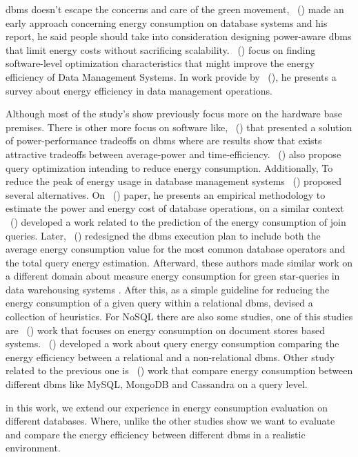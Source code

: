 \gls{dbms} doesn't escape the concerns and care of the green movement, \citeauthor{agrawal2008claremont}~(\citeyear{agrawal2008claremont}) made an early approach concerning energy consumption on database systems and his report, he said people should take into consideration designing power-aware \gls{dbms} that limit energy costs without sacrificing scalability.
\citeauthor{HarizopoulosEnergy}~(\citeyear{HarizopoulosEnergy}) focus on finding software-level optimization characteristics that might improve the energy efficiency of Data Management Systems. 
In work provide by \citeauthor{wang2011survey}~(\citeyear{wang2011survey}), he presents a survey about energy efficiency in data management operations.

Although most of the study's show previously focus more on the hardware base premises. There is other more focus on software like,
\citeauthor{5447840}~(\citeyear{5447840}) that presented a solution of power-performance tradeoffs on \gls{dbms} where are results show that exists attractive tradeoffs between average-power and time-efficiency. \citeauthor{xupet}~(\citeyear{xupet}) also propose query optimization intending to reduce energy consumption. Additionally, To reduce the peak of energy usage in database management systems \citeauthor{KunjirPeakPower}~(\citeyear{KunjirPeakPower}) proposed several alternatives. On \citeauthor{RODRIGUEZMARTINEZ2011112}~(\citeyear{RODRIGUEZMARTINEZ2011112}) paper, he presents an empirical methodology to estimate the power and energy cost of database operations, on a similar context \citeauthor{6738985}~(\citeyear{6738985}) developed a work related to the prediction of the energy consumption of join queries. Later, \citeauthor{gonçalvesbelo}~(\citeyear{gonçalvesbelo}) redesigned the \gls{dbms} execution plan to include both the average energy consumption value for the most common database operators and the total query energy estimation. Afterward, these authors made similar work on a different domain about measure energy consumption for green star-queries in data warehousing systems \cite{7396507}. After this, as a simple guideline for reducing the energy consumption of a given query within a relational \gls{dbms}, \cite{guimaraes2016some} devised a collection of heuristics. For NoSQL there are also some studies, one of this studies are \citeauthor{duarte2017evaluating}~(\citeyear{duarte2017evaluating}) work that focuses on energy consumption on document stores based systems. \citeauthor{Authenticus:P-00P-QKR}~(\citeyear{Authenticus:P-00P-QKR}) developed a work about query energy consumption comparing the energy efficiency between a relational and a non-relational \gls{dbms}. Other study related to the previous one is \citeauthor{mahajan2016energy}~(\citeyear{mahajan2016energy}) work that compare energy consumption between different \gls{dbms} like MySQL, MongoDB and Cassandra on a query level.

in this work, we extend our experience in energy consumption evaluation on different databases. Where, unlike the other studies show we want to evaluate and compare the energy efficiency between different \gls{dbms} in a realistic environment.




